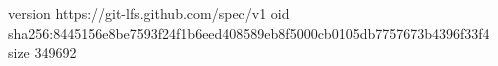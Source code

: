 version https://git-lfs.github.com/spec/v1
oid sha256:8445156e8be7593f24f1b6eed408589eb8f5000cb0105db7757673b4396f33f4
size 349692
